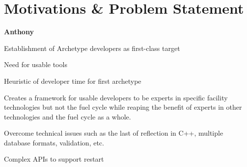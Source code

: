 \section{Motivations \& Problem Statement}

\textbf{Anthony}

Establishment of Archetype developers as first-class target

Need for usable tools

Heuristic of developer time for first archetype

Creates a framework for usable developers to be experts in specific facility 
technologies but not the fuel cycle while reaping the benefit of experts in 
other technologies and the fuel cycle as a whole.

Overcome technical issues such as the last of reflection in C++, multiple 
database formats, validation, etc.

Complex APIs to support restart
